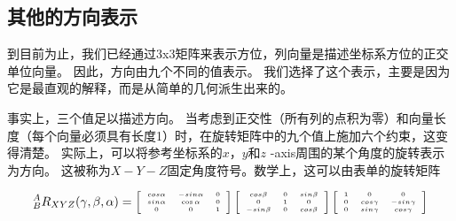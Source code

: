 \subsection{其他的方向表示}


到目前为止，我们已经通过3x3矩阵来表示方位，列向量是描述坐标系方位的正交单位向量。 因此，方向由九个不同的值表示。 我们选择了这个表示，主要是因为它是最直观的解释，而是从简单的几何派生出来的。


事实上，三个值足以描述方向。 当考虑到正交性（所有列的点积为零）和向量长度（每个向量必须具有长度1）时，在旋转矩阵中的九个值上施加六个约束，这变得清楚。 实际上，可以将参考坐标系的$ x $，$ y $和$ z $ -axis周围的某个角度的旋转表示为方向。 这被称为$ X-Y-Z $固定角度符号。数学上，这可以由表单的旋转矩阵

\begin{equation}
\tiny
^A_BR_{XYZ}(\gamma,\beta,\alpha)=\left[\begin{array}{ccc}cos\alpha & -sin\alpha & 0\\sin\alpha & \cos\alpha & 0\\0 & 0 & 1\end{array}\right]\left[\begin{array}{ccc}cos\beta& 0 & sin\beta\\0 & 1 & 0\\-sin\beta & 0 & cos\beta\end{array}\right]\left[\begin{array}{ccc}1 & 0 & 0 \\0 & cos\gamma & -sin\gamma\\0 & sin\gamma & cos\gamma\end{array}\right]
\end{equation}

